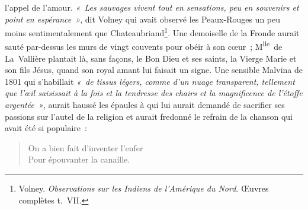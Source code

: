 \documentclass[french,twoside]{book} %
\begin{document}
\label{p602}l’appel de l’amour. \emph{« Les sauvages vivent tout en sensations, peu en souvenirs et point en espérance »}, dit Volney qui avait observé les Peaux-Rouges un peu moins sentimentalement que Chateaubriand\footnote{Volney. \emph{Observations sur les Indiens de l’Amérique du Nord}. Œuvres complètes t. VII.}. Une demoiselle de la Fronde aurait sauté par-dessus les murs de vingt couvents pour obéir à son cœur ; M\textsuperscript{lle} de La Vallière plantait là, sans façons, le Bon Dieu et ses saints, la Vierge Marie et son fils Jésus, quand son royal amant lui faisait un signe. Une sensible Malvina de 1801 qui s’habillait \emph{« de tissus légers, comme d’un nuage transparent, tellement que l’œil saisissait à la fois et la tendresse des chairs et la magnificence de l’étoffe argentée »}, aurait haussé les épaules à qui lui aurait demandé de sacrifier ses passions sur l’autel de la religion et aurait fredonné le refrain de la chanson qui avait été si populaire :\par


\begin{verse}
On a bien fait d’inventer l’enfer\\
Pour épouvanter la canaille.\\
\end{verse}
\end{document}
